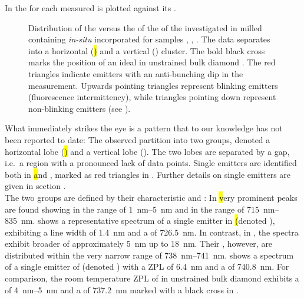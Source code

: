 	In  the \lw for each measured \ZPL is plotted against its \cwl.

	\begin{figure}[htp]
			\centering
			\caption[Spectral distribution of \siv \ZPLs]{Distribution of the \ZPL \cwl versus the \lw of the \ZPL of the investigated \sivs in milled \nds containing \textit{in-situ} incorporated \sivs for samples \insituF, \insituS, \insituH{}. The data separates into a horizontal (\hl) and a vertical (\vl) cluster. The bold black cross marks the position of an ideal \siv in unstrained bulk diamond \cite{Arend2016a}. The red triangles indicate emitters with an anti-bunching dip in the \gtz measurement. Upwards pointing triangles represent blinking emitters (fluorescence intermittency), while triangles pointing down represent non-blinking emitters (see ).}
			\label{fig::bimodal_distr}
	\end{figure}

	What immediately strikes the eye is a pattern that to our knowledge has not been reported to date:
	The observed \ZPLs partition into two groups, denoted a horizontal lobe (\hl) and a vertical lobe (\vl). The two lobes are separated by a gap, i.e.\ a region with a pronounced lack of data points.
	Single emitters are identified both in \hl and \vl, marked as red triangles in . Further details on single emitters are given in section .
	\\
	The two groups are defined by their characteristic \cwls and \lws:
	In \hl very prominent \ZPL peaks are found showing \lws in the range of \SIrange{1}{5}{nm} and \cwls in the range of \SIrange{715}{835}{nm}.
	 shows a representative spectrum of a single emitter in \hl (denoted \emnarrow), exhibiting a \ZPL line width of \SI{1.4}{nm} and a \cwl of \SI{726.5}{nm}.
	In contrast, in \vl, the spectra exhibit broader \ZPL \lws of approximately \SI{5}{nm} up to \SI{18}{nm}.
	Their \ZPL \cwls, however, are distributed within the very narrow range of \SIrange{738}{741}{nm}.
	 shows a spectrum of a single emitter of \vl (denoted \embroad) with a ZPL \lw of \SI{6.4}{nm} and a \cwl of \SI{740.8}{nm}.
	For comparison, the room temperature ZPL of \sivs in unstrained bulk diamond exhibits a \lw of \SIrange{4}{5}{nm} and a \cwl of \SI{737.2}{nm} marked with a black cross in  \cite{Arend2016a,Dietrich2014}.


